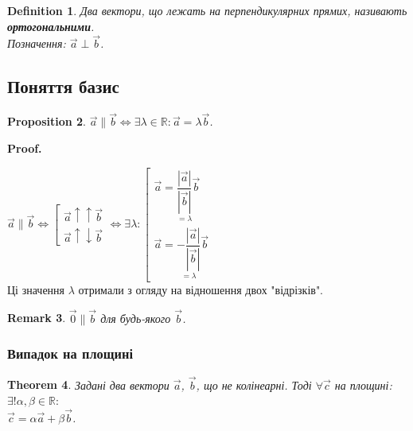 \documentclass[a4paper, 10pt]{extarticle}
\makeatletter
\def\qed{$\blacksquare$}
\def\qed{$\blacksquare$}
\theoremstyle{theoremdd}
\newtheorem{theorem}{Theorem}[subsection]
\theoremstyle{theoremdd}
\newtheorem{definition}[theorem]{Definition}
\theoremstyle{theoremdd}
\theoremstyle{theoremdd}
\theoremstyle{theoremdd}
\newtheorem{proposition}[theorem]{Proposition}
\theoremstyle{theoremdd}
\newtheorem{remark}[theorem]{Remark}
\theoremstyle{theoremdd}
\theoremstyle{theoremdd}
\renewenvironment{proof}[1][Proof.\\]{\par
\pushQED{\hfill \qed}%
\normalfont \topsep6\p@\@plus6\p@\relax
\trivlist
\item\relax
{\bfseries
#1\@addpunct{.}}\hspace\labelsep\ignorespaces
}{%
\popQED\endtrivlist\@endpefalse
}
\makeatother
\begin{document}
\begin{definition}
	Два вектори, що лежать на перпендикулярних прямих, називають \textbf{ортогональними}.\\
Позначення: $\vec{a} \perp \vec{b}$.
\end{definition}

\subsection{Поняття базис}
\begin{proposition}
$\vec{a} \parallel \vec{b} \iff \exists \lambda \in \mathbb{R}: \vec{a} = \lambda \vec{b}$.
\end{proposition}

\begin{proof}
$\vec{a} \parallel \vec{b} \iff \left[ \begin{gathered} \vec{a} \uparrow \uparrow \vec{b} \\ \vec{a} \uparrow \downarrow \vec{b} \end{gathered} \right. \iff \exists \lambda: \left[ \begin{gathered} \vec{a} = \underset{=\lambda}{\dfrac{|\vec{a}|}{|\vec{b}|}} \vec{b} \\ \vec{a} = \underset{=\lambda}{-\dfrac{|\vec{a}|}{|\vec{b}|}} \vec{b} \end{gathered} \right.$\\
Ці значення $\lambda$ отримали з огляду на відношення двох "відрізків".
\end{proof}

\begin{remark}
$\vec{0} \parallel \vec{b}$ для будь-якого $\vec{b}$.
\end{remark}

\subsubsection{Випадок на площині}
\begin{theorem}
Задані два вектори $\vec{a}$, $\vec{b}$, що не колінеарні. Тоді $\forall \vec{c}$ на площині: $\exists! \alpha, \beta \in \mathbb{R}:$\\
$\vec{c} = \alpha \vec{a} + \beta \vec{b}$.
\end{theorem}
\end{document}

